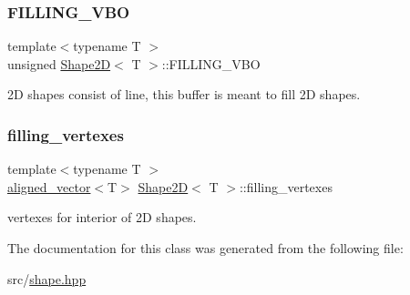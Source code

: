 \subsubsection{\texorpdfstring{F\+I\+L\+L\+I\+N\+G\+\_\+\+V\+BO}{FILLING\_VBO}}
{\footnotesize\ttfamily template$<$typename T $>$ \\
unsigned \mbox{\hyperlink{classShape2D}{Shape2D}}$<$ T $>$\+::F\+I\+L\+L\+I\+N\+G\+\_\+\+V\+BO\hspace{0.3cm}{\ttfamily [protected]}}

2D shapes consist of line, this buffer is meant to fill 2D shapes. \mbox{\label{classShape2D_ae3e216c9d8422b47f46bff9259bd17be}} 
\subsubsection{\texorpdfstring{filling\+\_\+vertexes}{filling\_vertexes}}
{\footnotesize\ttfamily template$<$typename T $>$ \\
\mbox{\hyperlink{type__definitions_8hpp_accb98a876f193a416d9c8a02fe22d526}{aligned\+\_\+vector}}$<$T$>$ \mbox{\hyperlink{classShape2D}{Shape2D}}$<$ T $>$\+::filling\+\_\+vertexes\hspace{0.3cm}{\ttfamily [protected]}}

vertexes for interior of 2D shapes. 

The documentation for this class was generated from the following file\+:\begin{DoxyCompactItemize}
\item 
src/\mbox{\hyperlink{shape_8hpp}{shape.\+hpp}}\end{DoxyCompactItemize}
